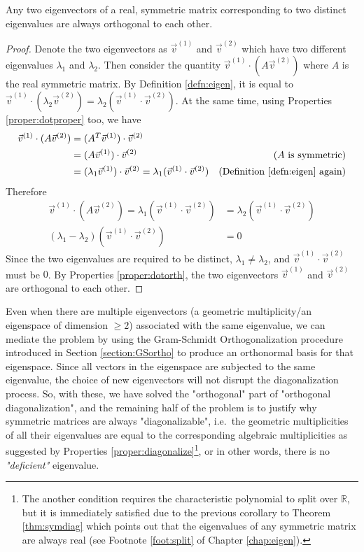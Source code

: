 \begin{proper}
\label{proper:symortho}
Any two eigenvectors of a real, symmetric matrix corresponding to two distinct eigenvalues are always orthogonal to each other.
\end{proper}
\begin{proof}
Denote the two eigenvectors as $\vec{v}^{(1)}$ and $\vec{v}^{(2)}$ which have two different eigenvalues $\lambda_1$ and $\lambda_2$. Then consider the quantity $\vec{v}^{(1)} \cdot (A\vec{v}^{(2)})$ where $A$ is the real symmetric matrix. By Definition \ref{defn:eigen}, it is equal to $\vec{v}^{(1)} \cdot (\lambda_{2}\vec{v}^{(2)}) \allowbreak = \lambda_{2}(\vec{v}^{(1)} \cdot \vec{v}^{(2)})$. At the same time, using Properties \ref{proper:dotproper} too, we have
\begin{align*}
\vec{v}^{(1)}\cdot (A\vec{v}^{(2)}) &= (A^T\vec{v}^{(1)})\cdot \vec{v}^{(2)} \\
&= (A\vec{v}^{(1)})\cdot \vec{v}^{(2)} &\text{($A$ is symmetric)} \\
&= (\lambda_1\vec{v}^{(1)})\cdot \vec{v}^{(2)} = \lambda_1(\vec{v}^{(1)} \cdot \vec{v}^{(2)}) &\text{(Definition \ref{defn:eigen} again)}
\end{align*}
Therefore
\begin{align*}
\vec{v}^{(1)} \cdot (A\vec{v}^{(2)}) =  \lambda_1(\vec{v}^{(1)} \cdot \vec{v}^{(2)}) &= \lambda_{2}(\vec{v}^{(1)}\cdot \vec{v}^{(2)}) \\
(\lambda_{1}-\lambda_{2})(\vec{v}^{(1)} \cdot \vec{v}^{(2)}) &= 0
\end{align*}
Since the two eigenvalues are required to be distinct, $\lambda_{1} \neq \lambda_{2}$, and $\vec{v}^{(1)} \cdot \vec{v}^{(2)}$ must be $0$. By Properties \ref{proper:dotorth}, the two eigenvectors $\vec{v}^{(1)}$ and $\vec{v}^{(2)}$ are orthogonal to each other.
\end{proof}
Even when there are multiple eigenvectors (a geometric multiplicity/an eigenspace of dimension $\geq 2$) associated with the same eigenvalue, we can mediate the problem by using the Gram-Schmidt Orthogonalization procedure introduced in Section \ref{section:GSortho} to produce an orthonormal basis for that eigenspace. Since all vectors in the eigenspace are subjected to the same eigenvalue, the choice of new eigenvectors will not disrupt the diagonalization process. So, with these, we have solved the "orthogonal" part of "orthogonal diagonalization", and the remaining half of the problem is to justify why symmetric matrices are always "diagonalizable", i.e.\ the geometric multiplicities of all their eigenvalues are equal to the corresponding algebraic multiplicities as suggested by Properties \ref{proper:diagonalize}\footnote{The another condition requires the characteristic polynomial to split over $\mathbb{R}$, but it is immediately satisfied due to the previous corollary to Theorem \ref{thm:symdiag} which points out that the eigenvalues of any symmetric matrix are always real (see Footnote \ref{foot:split} of Chapter \ref{chap:eigen}).}, or in other words, there is no \textit{"deficient"} eigenvalue.
